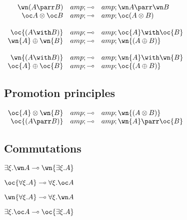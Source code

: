 \(\begin{array}{rcl}
  \wn(A\parr B) &amp;\limp&amp; \wn A\parr\wn B \\
  \oc A\tens\oc B &amp;\limp&amp; \oc(A\tens B) \\
\\
 \oc{(A \with B)} &amp;\limp&amp; \oc{A} \with \oc{B} \\
 \wn{A} \plus \wn{B} &amp;\limp&amp; \wn{(A \plus B)} \\
\\
 \wn{(A \with B)} &amp;\limp&amp; \wn{A} \with \wn{B} \\
 \oc{A} \plus \oc{B} &amp;\limp&amp; \oc{(A \plus B)}
\end{array}\)

\subsection{Promotion principles}\label{promotion-principles}

\(\begin{array}{rcl}
 \oc{A} \tens \wn{B} &amp;\limp&amp; \wn{(A \tens B)} \\
 \oc{(A \parr B)} &amp;\limp&amp; \wn{A} \parr \oc{B}
\end{array}\)

\subsection{Commutations}\label{commutations}

\(\exists \xi . \wn A \limp \wn{\exists \xi . A}\)

\(\oc{\forall \xi . A} \limp \forall \xi . \oc A\)

\(\wn{\forall \xi . A} \limp \forall \xi . \wn A\)

\(\exists \xi . \oc A \limp \oc{\exists \xi . A}\)

